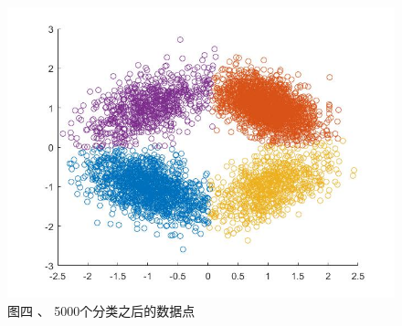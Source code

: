 \documentclass[bachelor]{ctexart}
\begin{document}
\begin{figure}[!htb]
  \centering
  \includegraphics[scale=0.45]{4.jpg}\\
  {\footnotesize 图四 、   5000个分类之后的数据点}\\
\end{figure}
\end{document}
